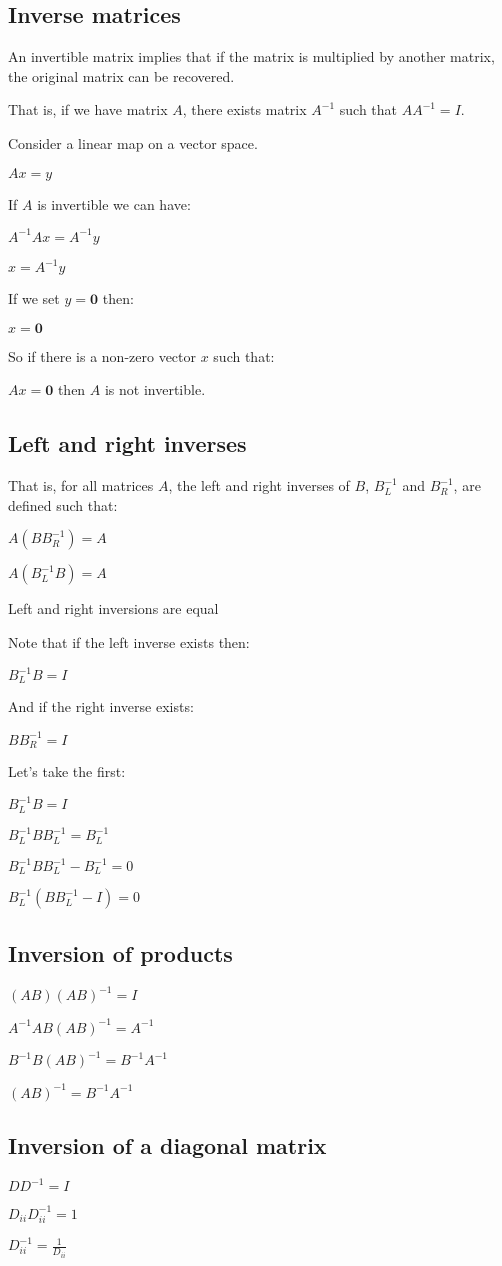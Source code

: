 
\subsection{Inverse matrices}

An invertible matrix implies that if the matrix is multiplied by another matrix, the original matrix can be recovered.

That is, if we have matrix \(A\), there exists matrix \(A^{-1}\) such that \(AA^{-1}=I\).

Consider a linear map on a vector space.

\(Ax=y\)

If \(A\) is invertible we can have:

\(A^{-1}Ax=A^{-1}y\)

\(x=A^{-1}y\)

If we set \(y=\mathbf 0\) then:

\(x=\mathbf 0\)

So if there is a non-zero vector \(x\) such that:

\(Ax=\mathbf 0\) then \(A\) is not invertible.

\subsection{Left and right inverses}

That is, for all matrices \(A\), the left and right inverses of \(B\), \(B_L^{-1}\) and \(B_R^{-1}\), are defined such that:

\(A(BB_R^{-1})=A\)

\(A(B_L^{-1}B)=A\)

Left and right inversions are equal

Note that if the left inverse exists then:

\(B_L^{-1}B=I\)

And if the right inverse exists:

\(BB_R^{-1}=I\)

Let’s take the first:

\(B_L^{-1}B=I\)

\(B_L^{-1}BB_L^{-1}=B_L^{-1}\)

\(B_L^{-1}BB_L^{-1}-B_L^{-1}=0\)

\(B_L^{-1}(BB_L^{-1}-I)=0\)

\subsection{Inversion of products}

\((AB)(AB)^{-1}=I\)

\(A^{-1}AB(AB)^{-1}=A^{-1}\)

\(B^{-1}B(AB)^{-1}=B^{-1}A^{-1}\)

\((AB)^{-1}=B^{-1}A^{-1}\)

\subsection{Inversion of a diagonal matrix}

\(DD^{-1}=I\)

\(D_{ii}D_{ii}^{-1}=1\)

\(D_{ii}^{-1}=\frac{1}{D_{ii}}\)

